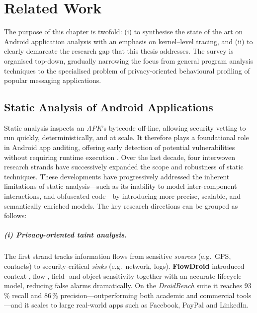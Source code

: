 \documentclass[a4paper,12pt]{report}
\begin{document}
\chapter{Related Work}\label{ch:related}

The purpose of this chapter is twofold: (i) to synthesise the state of the art on Android
application analysis with an emphasis on kernel–level tracing, and (ii) to
clearly demarcate the research gap that this thesis addresses.  The survey is
organised top‑down, gradually narrowing the focus from general program analysis
techniques to the specialised problem of privacy‑oriented behavioural
profiling of popular messaging applications.

\section{Static Analysis of Android Applications}
\label{sec:rw:static}

Static analysis inspects an \emph{APK}'s bytecode off-line, allowing security vetting to run quickly, deterministically, and at scale. It therefore plays a foundational role in Android app auditing, offering early detection of potential vulnerabilities without requiring runtime execution \cite{arzt2014flowdroid}.  Over the last decade, four interwoven research strands have successively expanded the scope and robustness of static techniques. These developments have progressively addressed the inherent limitations of static analysis—such as its inability to model inter-component interactions, and obfuscated code—by introducing more precise, scalable, and semantically enriched models. The key research directions can be grouped as follows:

\paragraph{(i) Privacy-oriented taint analysis.}
The first strand tracks information flows from sensitive \emph{sources} (e.g.\ GPS, contacts) to security-critical \emph{sinks} (e.g.\ network, logs).  \textbf{FlowDroid} introduced context-, flow-, field- and object-sensitivity together with an accurate lifecycle model, reducing false alarms dramatically.  On the \emph{DroidBench} suite it reaches 93\,\% recall and 86\,\% precision—outperforming both academic and commercial tools \cite{arzt2014flowdroid}—and it scales to large real-world apps such as Facebook, PayPal and LinkedIn.
\end{document}
